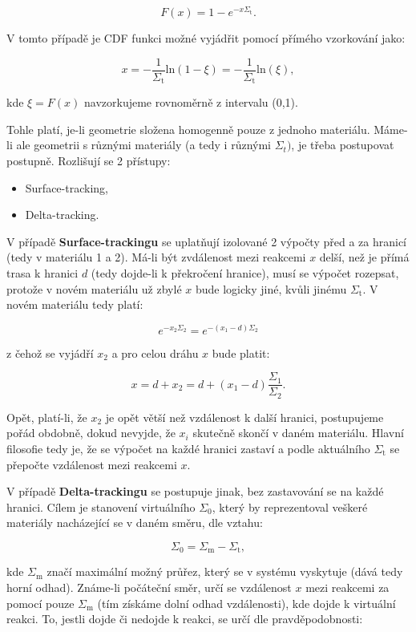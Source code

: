 $$ F(x) = 1 - e^{-x \Sigma_\text{t}}. $$

V tomto případě je CDF funkci možné vyjádřit pomocí přímého vzorkování jako:

$$ x = -\dfrac{1}{\Sigma_{\text{t}}} \text{ln}(1-\xi) = -\dfrac{1}{\Sigma_{\text{t}}} \text{ln}(\xi), $$

kde $\xi = F(x)$ navzorkujeme rovnoměrně z intervalu (0,1). 

Tohle platí, je-li geometrie složena homogenně pouze z jednoho materiálu. Máme-li ale geometrii s různými materiály (a tedy i různými $\Sigma_{t})$, je třeba postupovat postupně. Rozlišují se 2 přístupy:

\begin{itemize}
  \item Surface-tracking,
  \item Delta-tracking.
\end{itemize}

V případě \textbf{Surface-trackingu} se uplatňují izolované 2 výpočty před a za hranicí (tedy v materiálu 1 a 2). Má-li být zvdálenost mezi reakcemi $x$ delší, než je přímá trasa k hranici $d$ (tedy dojde-li k překročení hranice), musí se výpočet rozepsat, protože v novém materiálu už zbylé $x$ bude logicky jiné, kvůli jinému $\Sigma_\text{t}$. V novém materiálu tedy platí:

$$ e^{-x_2 \Sigma_2} = e^{-(x_1-d)\Sigma_2} $$

z čehož se vyjádří $x_2$ a pro celou dráhu $x$ bude platit:

$$ x = d + x_2 = d + (x_1 - d) \dfrac{\Sigma_1}{\Sigma_2}. $$

Opět, platí-li, že $x_2$ je opět větší než vzdálenost k další hranici, postupujeme pořád obdobně, dokud nevyjde, že $x_i$ skutečně skončí v daném materiálu. Hlavní filosofie tedy je, že se výpočet na každé hranici zastaví a podle aktuálního $\Sigma_\text{t}$ se přepočte vzdálenost mezi reakcemi $x$.

V případě \textbf{Delta-trackingu} se postupuje jinak, bez zastavování se na každé hranici. Cílem je stanovení virtuálního $\Sigma_0$, který by reprezentoval veškeré materiály nacházející se v daném směru, dle vztahu:

$$ \Sigma_0 = \Sigma_\text{m} - \Sigma_\text{t}, $$

kde $\Sigma_\text{m}$ značí maximální možný průřez, který se v systému vyskytuje (dává tedy horní odhad). Známe-li počáteční směr, určí se vzdálenost $x$ mezi reakcemi za pomocí pouze $\Sigma_\text{m}$ (tím získáme dolní odhad vzdálenosti), kde dojde k virtuální reakci. To, jestli dojde či nedojde k reakci, se určí dle pravděpodobnosti:

